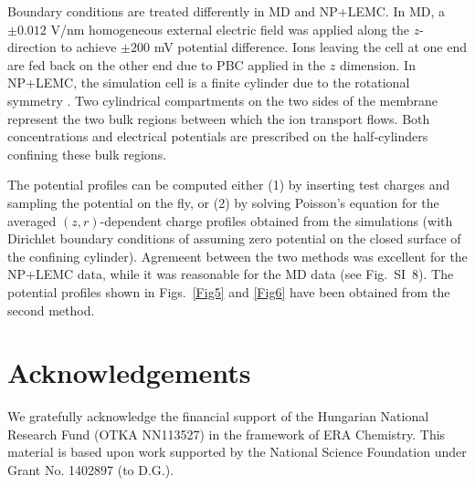 \documentclass[fleqn,10pt]{SelfArx} %
\begin{document}
Boundary conditions are treated differently in MD and NP+LEMC. 
In MD, a $\pm 0.012$ V/nm homogeneous external electric field was applied along the $z$-direction to achieve $\pm 200$ mV potential difference.
Ions leaving the cell at one end are fed back on the other end due to PBC applied in the $z$ dimension.
In NP+LEMC, the simulation cell is a finite cylinder due to the rotational symmetry \cite{boda-jctc-8-824-2012,boda-jml-189-100-2014,boda-arcc-2014}.
Two cylindrical compartments on the two sides of the membrane represent the two bulk regions between which the ion transport flows.
Both concentrations and electrical potentials are prescribed on the half-cylinders confining these bulk regions.

The potential profiles can be computed either (1) by inserting test charges and sampling the potential on the fly, or (2) by solving Poisson's equation for the averaged $(z,r)$-dependent charge profiles obtained from the simulations (with Dirichlet boundary conditions of assuming zero potential on the closed surface of the confining cylinder).
Agremeent between the two methods was excellent for the NP+LEMC data, while it was reasonable for the MD data (see Fig.\ SI\ 8).
The potential profiles shown in Figs.\ \ref{Fig5} and \ref{Fig6} have been obtained from the second method.


\section*{Acknowledgements}
\label{sec:ack}


We gratefully acknowledge the financial support of the Hungarian National Research Fund (OTKA NN113527) in the framework of ERA Chemistry.
This material is based upon work supported by the National Science Foundation under Grant No. 1402897 (to D.G.).
\end{document}
